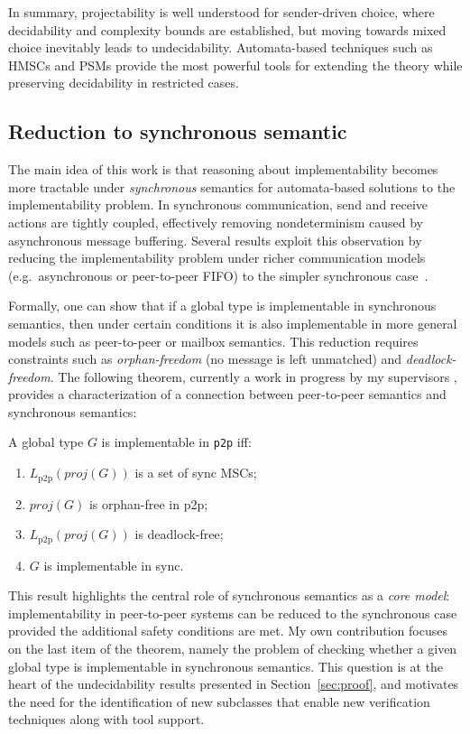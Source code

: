 In summary, projectability is well understood for sender-driven choice, 
where decidability and complexity bounds are established, but moving 
towards mixed choice inevitably leads to undecidability. Automata-based 
techniques such as HMSCs and PSMs provide the most powerful tools for 
extending the theory while preserving decidability in restricted cases.

\subsection{Reduction to synchronous semantic}
The main idea of this work is that reasoning about implementability 
becomes more tractable under \emph{synchronous} 
semantics for automata-based solutions to the implementability problem. 
In synchronous communication, send and receive actions 
are tightly coupled, effectively removing nondeterminism 
caused by asynchronous message buffering. Several results exploit this 
observation by reducing the implementability problem under richer 
communication models (e.g.\ asynchronous or peer-to-peer FIFO) to the 
simpler synchronous case~\cite{alur2005realizability,di2023partial}.

Formally, one can show that if a global type is implementable in 
synchronous semantics, then under certain conditions it is also 
implementable in more general models such as peer-to-peer or mailbox 
semantics. This reduction requires constraints such as 
\emph{orphan-freedom} (no message is left unmatched) and
\emph{deadlock-freedom}.
The following theorem, currently a work in progress by my supervisors \cite{di2025realisability}, 
provides a characterization of a connection between 
peer-to-peer semantics and synchronous semantics:

\begin{theorem}
	A global type $G$ is implementable in \verb|p2p| iff:
	\begin{enumerate}
		\item $L_{\text{p2p}}(proj(G))$ is a set of sync MSCs;
		\item $proj(G)$ is orphan-free in p2p;
		\item $L_{\text{p2p}}(proj(G))$ is deadlock-free;
		\item $G$ is implementable in sync.
	\end{enumerate}
\end{theorem}

This result highlights the central role of synchronous semantics as a 
\emph{core model}: implementability in peer-to-peer systems 
can be reduced to the synchronous case provided the additional safety 
conditions are met. My own contribution focuses on the last item of the 
theorem, namely the problem of checking whether a given global type is 
implementable in synchronous semantics. This question is at the heart 
of the undecidability results presented in Section~\ref{sec:proof}, 
and motivates the need for the identification of new subclasses that 
enable new verification techniques along with tool support.

